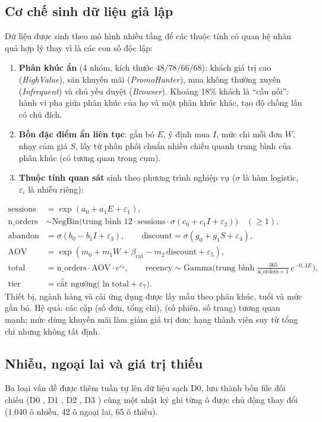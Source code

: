 \subsection{Cơ chế sinh dữ liệu giả lập}
Dữ liệu được sinh theo mô hình nhiều tầng để các thuộc tính có quan hệ nhân quả hợp lý thay vì là các con số độc lập:
\begin{enumerate}
\item \textbf{Phân khúc ẩn} (4 nhóm, kích thước $48/78/66/68$): khách giá trị cao (\emph{HighValue}), săn khuyến mãi (\emph{PromoHunter}), mua không thường xuyên (\emph{Infrequent}) và chủ yếu duyệt (\emph{Browser}).
Khoảng 18\% khách là ``cầu nối'': hành vi pha giữa phân khúc của họ và một phân khúc khác, tạo độ chồng lấn có chủ đích.
\item \textbf{Bốn đặc điểm ẩn liên tục}: gắn bó $E$, ý định mua $I$, mức chi mỗi đơn $W$, nhạy cảm giá $S$, lấy từ phân phối chuẩn nhiều chiều quanh trung bình của phân khúc (có tương quan trong cụm).
\item \textbf{Thuộc tính quan sát} sinh theo phương trình nghiệp vụ ($\sigma$ là hàm logistic, $\varepsilon_i$ là nhiễu riêng):
\end{enumerate}
\begin{align*}
\mathrm{sessions} &= \exp(a_0 + a_1 E + \varepsilon_1),\\
\mathrm{n\_orders} &\sim \mathrm{NegBin}\!\big(\text{trung bình } 12\cdot\mathrm{sessions}\cdot\sigma(c_0 + c_1 I + \varepsilon_2)\big)\quad(\ge 1),\\
\mathrm{abandon} &= \sigma(b_0 - b_1 I + \varepsilon_3), \qquad \mathrm{discount} = \sigma(g_0 + g_1 S + \varepsilon_4),\\
\mathrm{AOV} &= \exp(m_0 + m_1 W + \beta_{\mathrm{cat}} - m_2\,\mathrm{discount} + \varepsilon_5),\\
\mathrm{total} &= \mathrm{n\_orders}\cdot\mathrm{AOV}\cdot e^{\varepsilon_6}, \qquad \mathrm{recency} \sim \mathrm{Gamma}\!\big(\text{trung bình } \tfrac{365}{\mathrm{n\_orders}+1}\,e^{-0{,}3E}\big),\\
\mathrm{tier} &= \text{cắt ngưỡng}\big(\ln \mathrm{total} + \varepsilon_7\big).
\end{align*}
Thiết bị, ngành hàng và cài ứng dụng được lấy mẫu theo phân khúc, tuổi và mức gắn bó. Hệ quả: các cặp (số đơn, tổng chi), (số phiên, số trang) tương quan mạnh; mức dùng khuyến mãi làm giảm giá trị đơn; hạng thành viên suy từ tổng chi nhưng không tất định.

\subsection{Nhiễu, ngoại lai và giá trị thiếu}
Ba loại vấn đề được thêm tuần tự lên dữ liệu sạch D0, lưu thành bốn file đối chiếu (D0 , D1 , D2 , D3 ) cùng một nhật ký ghi từng ô được chủ động thay đổi (1.040 ô nhiễu, 42 ô ngoại lai, 65 ô thiếu).

